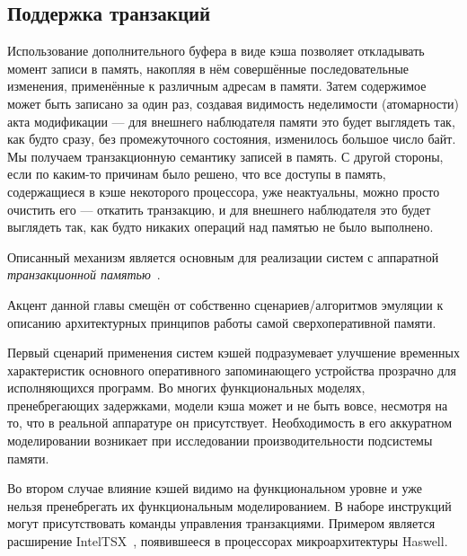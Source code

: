 \subsection{Поддержка транзакций}

Использование дополнительного буфера в виде кэша позволяет откладывать момент записи в память, накопляя в нём совершённые последовательные изменения, применённые к различным адресам в памяти. Затем содержимое может быть записано за один раз, создавая видимость неделимости (атомарности) акта модификации —  для внешнего наблюдателя памяти это будет выглядеть так, как будто сразу, без промежуточного состояния, изменилось большое число байт. Мы получаем транзакционную семантику записей в память. С другой стороны, если по каким-то причинам было решено, что все доступы в память, содержащиеся в кэше некоторого процессора, уже неактуальны, можно просто очистить его — откатить транзакцию, и для внешнего наблюдателя это будет выглядеть так, как будто никаких операций над памятью не было выполнено.

Описанный  механизм является основным для реализации систем с аппаратной \textit{транзакционной памятью}~\cite{rajwar2002}.

\begin{digression}

Акцент данной главы смещён от собственно сценариев/алгоритмов эмуляции к описанию архитектурных принципов работы самой сверхоперативной памяти. 

Первый сценарий применения систем кэшей подразумевает улучшение временных характеристик основного оперативного запоминающего устройства прозрачно для исполняющихся программ. Во многих функциональных моделях, пренебрегающих задержками, модели кэша может и не быть вовсе, несмотря на то, что в реальной аппаратуре он присутствует. Необходимость в его аккуратном моделировании возникает при  исследовании производительности подсистемы памяти.

Во втором случае влияние кэшей видимо на функциональном уровне и уже нельзя пренебрегать их функциональным моделированием. В наборе инструкций могут присутствовать команды управления транзакциями. Примером является расширение Intel\textregistered TSX~\cite[глава 8]{intel-x-reference}, появившееся в процессорах микроархитектуры Haswell.

\end{digression}


